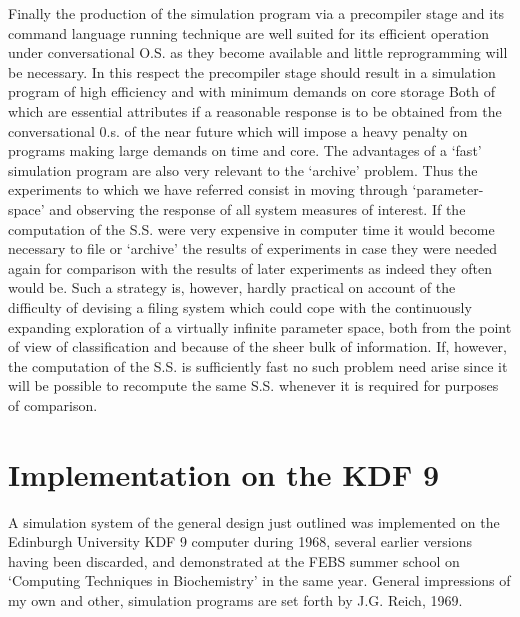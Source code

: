 Finally the production of the simulation program via a precompiler stage and its command language running technique are well suited for its efficient operation under conversational O.S. as they become available and little reprogramming will be necessary. In this respect the precompiler stage should result in a simulation program of high efficiency and with minimum demands on core storage Both of which are essential attributes if a reasonable response is to be obtained from the conversational 0.s. of the near future which will impose a heavy penalty on programs making large demands on time and core. The advantages of a `fast' simulation program are also very relevant to the `archive' problem. Thus the experiments to which we have referred consist in moving through `parameter-space' and observing the response of all system measures of interest. If the computation of the S.S. were very expensive in computer time it would become necessary to file or `archive' the results of experiments in case they were needed again for comparison with the results of later experiments as indeed they often would be. Such a strategy is, however, hardly practical on account of the difficulty of devising a filing system which could cope with the continuously expanding exploration of a virtually infinite parameter space, both from the point of view of classification and because of the sheer bulk of information. If, however, the computation of the S.S. is sufficiently fast no such problem need arise since it will be possible to recompute the same S.S. whenever it is required for purposes of comparison.

\section{Implementation on the KDF 9}

A simulation system of the general design just outlined was implemented on the Edinburgh University KDF 9 computer during 1968, several earlier versions having been discarded, and demonstrated at the FEBS summer school on `Computing Techniques in Biochemistry' in the same year. General impressions of my own and other, simulation programs are set forth by J.G. Reich, 1969.

